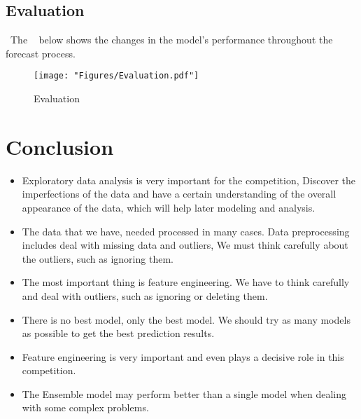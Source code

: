 \subsection{Evaluation}
\
The  ~ below shows the changes 
in the model's performance throughout the forecast process.

\begin{figure}[tbph]
	\centering
	\texttt{[image: "Figures/Evaluation.pdf"]}
	\caption{Evaluation}
	\label{fig:Evaluation}
\end{figure}

\section{Conclusion}

\begin{itemize}
	\item Exploratory data analysis is 
	very important for the competition,
	Discover the imperfections of the 
	data and have a certain understanding 
	of the overall appearance of the data, 
	which will help later modeling and analysis. 
	\item The data that we have,
	needed processed in many cases.
	Data preprocessing includes 
	deal with missing data and outliers, 
	We must think carefully about the outliers, 
	such as ignoring them.
	\item The most important thing is
	feature engineering.
	We have to think carefully and 
	deal with outliers, such as ignoring 
	or deleting them.
	\item There is no best model, 
	only the best model. We should 
	try as many models as possible to 
	get the best prediction results. 
	\item Feature engineering is very 
	important and even plays a decisive 
	role in this competition.
	\item The Ensemble model may perform better 
	than a single model when dealing 
	with some complex problems.	
\end{itemize}











